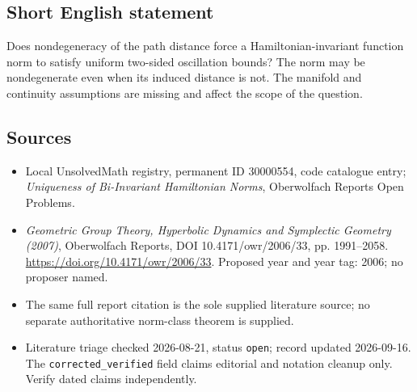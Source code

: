 \documentclass[11pt]{article}
\begin{document}
\subsection{Short English statement}
Does nondegeneracy of the path distance force a Hamiltonian-invariant function norm to satisfy uniform two-sided oscillation bounds? The norm may be nondegenerate even when its induced distance is not. The manifold and continuity assumptions are missing and affect the scope of the question.
\subsection{Sources}
\begin{itemize}\item Local UnsolvedMath registry, permanent ID 30000554, code catalogue entry; \emph{Uniqueness of Bi-Invariant Hamiltonian Norms}, Oberwolfach Reports Open Problems.\item \emph{Geometric Group Theory, Hyperbolic Dynamics and Symplectic Geometry (2007)}, Oberwolfach Reports, DOI 10.4171/owr/2006/33, pp. 1991--2058. \url{https://doi.org/10.4171/owr/2006/33}. Proposed year and year tag: 2006; no proposer named.\item The same full report citation is the sole supplied literature source; no separate authoritative norm-class theorem is supplied.\item Literature triage checked 2026-08-21, status \texttt{open}; record updated 2026-09-16. The \texttt{corrected\_verified} field claims editorial and notation cleanup only. Verify dated claims independently.\end{itemize}
\end{document}

